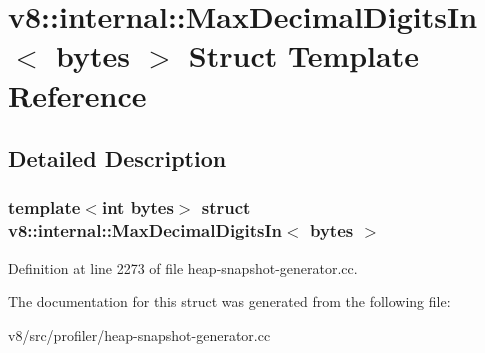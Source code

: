 \hypertarget{structv8_1_1internal_1_1MaxDecimalDigitsIn}{}\section{v8\+:\+:internal\+:\+:Max\+Decimal\+Digits\+In$<$ bytes $>$ Struct Template Reference}
\label{structv8_1_1internal_1_1MaxDecimalDigitsIn}


\subsection{Detailed Description}
\subsubsection*{template$<$int bytes$>$\newline
struct v8\+::internal\+::\+Max\+Decimal\+Digits\+In$<$ bytes $>$}



Definition at line 2273 of file heap-\/snapshot-\/generator.\+cc.



The documentation for this struct was generated from the following file\+:\begin{DoxyCompactItemize}
\item 
v8/src/profiler/heap-\/snapshot-\/generator.\+cc\end{DoxyCompactItemize}
